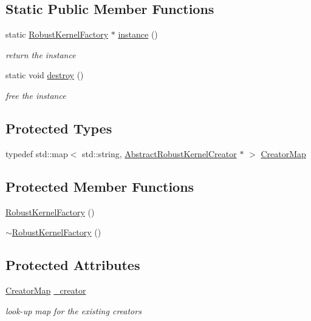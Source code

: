 \subsection*{Static Public Member Functions}
\begin{DoxyCompactItemize}
\item 
static \hyperlink{classg2o_1_1RobustKernelFactory}{Robust\+Kernel\+Factory} $\ast$ \hyperlink{classg2o_1_1RobustKernelFactory_a9cc4361620f8d7269ad9774d3aba2fc0}{instance} ()
\begin{DoxyCompactList}\small\item\em return the instance \end{DoxyCompactList}\item 
static void \hyperlink{classg2o_1_1RobustKernelFactory_a6c96f77eb4a14e5e8f5b46eb734c0393}{destroy} ()
\begin{DoxyCompactList}\small\item\em free the instance \end{DoxyCompactList}\end{DoxyCompactItemize}
\subsection*{Protected Types}
\begin{DoxyCompactItemize}
\item 
typedef std\+::map$<$ std\+::string, \hyperlink{classg2o_1_1AbstractRobustKernelCreator}{Abstract\+Robust\+Kernel\+Creator} $\ast$ $>$ \hyperlink{classg2o_1_1RobustKernelFactory_aa143765542cbf4738e2137d61517b218}{Creator\+Map}
\end{DoxyCompactItemize}
\subsection*{Protected Member Functions}
\begin{DoxyCompactItemize}
\item 
\hyperlink{classg2o_1_1RobustKernelFactory_af1df5179d6823881c9c3531640029eae}{Robust\+Kernel\+Factory} ()
\item 
\hyperlink{classg2o_1_1RobustKernelFactory_a4b644b5cbf7f9bec42b8c168e8416011}{$\sim$\+Robust\+Kernel\+Factory} ()
\end{DoxyCompactItemize}
\subsection*{Protected Attributes}
\begin{DoxyCompactItemize}
\item 
\hyperlink{classg2o_1_1RobustKernelFactory_aa143765542cbf4738e2137d61517b218}{Creator\+Map} \hyperlink{classg2o_1_1RobustKernelFactory_af5f3cea409d3f18baa40da898d21424b}{\+\_\+creator}
\begin{DoxyCompactList}\small\item\em look-\/up map for the existing creators \end{DoxyCompactList}\end{DoxyCompactItemize}
